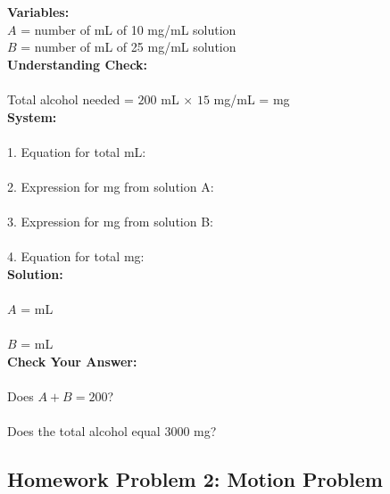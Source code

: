 \documentclass[12pt]{article}
\begin{document}
            \textbf{Variables:}\\
            $A$ = number of mL of 10 mg/mL solution\\
            $B$ = number of mL of 25 mg/mL solution\\
        
            \textbf{Understanding Check:}\\\\
            Total alcohol needed = $200$ mL $\times$ $15$ mg/mL = \underline{\hspace{1in}} mg\\
        
            \textbf{System:}\\\\
            1. Equation for total mL: \underline{\hspace{4in}}\\\\
            2. Expression for mg from solution A: \underline{\hspace{3.5in}}\\\\
            3. Expression for mg from solution B: \underline{\hspace{3.5in}}\\\\
            4. Equation for total mg: \underline{\hspace{4in}}\\
        
            \textbf{Solution:}\\\\
            $A$ = \underline{\hspace{1in}} mL\\\\
            $B$ = \underline{\hspace{1in}} mL\\
        
            \textbf{Check Your Answer:}\\\\
            Does $A + B = 200$? \underline{\hspace{3in}}\\\\
            Does the total alcohol equal 3000 mg? \underline{\hspace{4.5in}}
        
            \newpage
        
        \subsection*{Homework Problem 2: Motion Problem}
\end{document}
